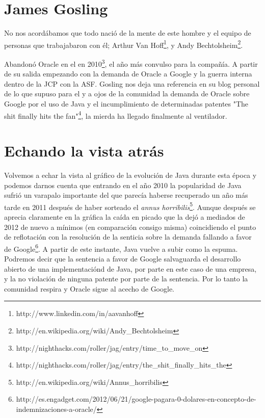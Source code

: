 \documentclass[11pt]{scrartcl}
\begin{document}
\section{James Gosling}

No nos acordábamos que todo nació de la mente de este hombre y el equipo de personas que trabajabaron con él; Arthur Van Hoff\footnote{http://www.linkedin.com/in/aavanhoff}, y Andy Bechtolsheim\footnote{http://en.wikipedia.org/wiki/Andy\_Bechtolsheim}.

Abandonó Oracle en el en 2010\footnote{http://nighthacks.com/roller/jag/entry/time\_to\_move\_on}, el año más convulso para la compañía. A partir de su salida empezando con la demanda de Oracle a Google y la guerra interna dentro de la JCP con la ASF. Gosling nos deja una referencia en su blog personal de lo que supuso para el y a ojos de la comunidad la demanda de Oracle sobre Google por el uso de Java y el incumplimiento de determinadas patentes "The shit finally hits the fan"\footnote{http://nighthacks.com/roller/jag/entry/the\_shit\_finally\_hits\_the}, la mierda ha llegado finalmente al ventilador.

\section{Echando la vista atrás}

Volvemos a echar la vista al gráfico de la evolución de Java durante esta época y podemos darnos cuenta que entrando en el año 2010 la popularidad de Java sufrió un varapalo importante del que parecía haberse recuperado un año más tarde en 2011 después de haber sorteado el \emph{annus horribilis}\footnote{http://en.wikipedia.org/wiki/Annus\_horribilis}. Aunque después se aprecia claramente en la gráfica la caída en picado que la dejó a mediados de 2012 de nuevo a mínimos (en comparación consigo misma) coincidiendo el punto de reflotación con la resolución de la senticia sobre la demanda fallando a favor de Google\footnote{http://es.engadget.com/2012/06/21/google-pagara-0-dolares-en-concepto-de-indemnizaciones-a-oracle/}. A partir de este instante, Java vuelve a subir como la espuma.\\
Podremos decir que la sentencia a favor de Google salvaguarda el desarrollo abierto de una implementaciónd de Java, por parte en este caso de una empresa, y la no violación de ninguna patente por parte de la sentencia. Por lo tanto la comunidad respira y Oracle sigue al acecho de Google.\\
\end{document}
